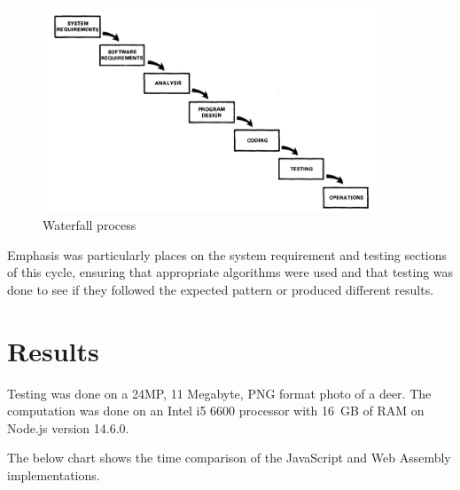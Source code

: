 \documentclass[12pt,a4paper]{article}
\begin{document}
\begin{figure}[H]
    \centering
    \includegraphics[width=10cm]{waterfall.png}
    \caption{Waterfall process}
    \label{waterfall}
\end{figure}


Emphasis was particularly places on the system requirement and testing sections of this cycle, ensuring that appropriate algorithms were used and that testing was done to see if they followed the expected pattern or produced different results.



\section{Results}

Testing was done on a 24MP, 11 Megabyte, PNG format photo of a deer. The computation was done on an Intel i5 6600 processor with 16 GB of RAM on Node.js version 14.6.0.


The below chart shows the time comparison of the JavaScript and Web Assembly implementations.
\end{document}
